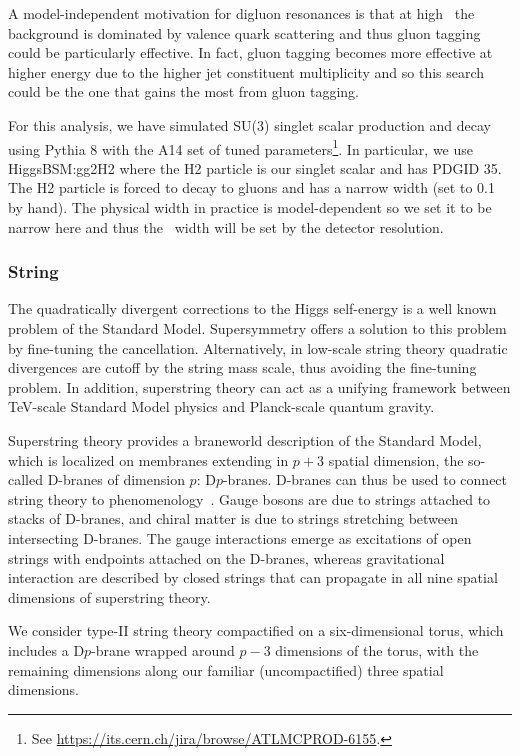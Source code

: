 A model-independent motivation for digluon resonances is that at high \mjj\, the background is dominated by valence quark scattering and thus gluon tagging could be particularly effective.  In fact, gluon tagging becomes more effective at higher energy due to the higher jet constituent multiplicity and so this search could be the one that gains the most from gluon tagging.

For this analysis, we have simulated SU(3) singlet scalar production and decay using Pythia 8 with the A14 set of tuned parameters\footnote{See \url{https://its.cern.ch/jira/browse/ATLMCPROD-6155}.}.  In particular, we use HiggsBSM:gg2H2 where the H2 particle is our singlet scalar and has PDGID 35.  The H2 particle is forced to decay to gluons and has a narrow width (set to 0.1 by hand).  The physical width in practice is model-dependent so we set it to be narrow here and thus the \mjj\ width will be set by the detector resolution.

\clearpage
\subsubsection{String}

The quadratically divergent corrections to the Higgs self-energy is a
well known problem of the Standard Model.
Supersymmetry offers a solution to this problem by fine-tuning the
cancellation. 
Alternatively, in low-scale string theory quadratic divergences are 
cutoff by the string mass scale, thus avoiding the fine-tuning problem.
In addition, superstring theory can act as a unifying framework between
TeV-scale Standard Model physics and Planck-scale quantum gravity.  

Superstring theory provides a braneworld description of the Standard
Model, which is localized on membranes extending in $p+3$ spatial
dimension, the so-called D-branes of dimension $p$: D$p$-branes.
D-branes can thus be used to connect string theory to
phenomenology~\cite{Antoniadis:2000ena,Cremades:2002qm,Antoniadis:2002qm}.
Gauge bosons are due to strings attached to stacks of D-branes, and
chiral matter is due to strings stretching between intersecting D-branes.
The gauge interactions emerge as excitations of open strings with endpoints
attached on the D-branes, whereas gravitational interaction are described
by closed strings that can propagate in all nine spatial dimensions of
superstring theory.

We consider type-II string theory compactified on a six-dimensional
torus, which includes a D$p$-brane wrapped around $p-3$ dimensions of the
torus, with the remaining dimensions along our familiar (uncompactified)
three spatial dimensions.

